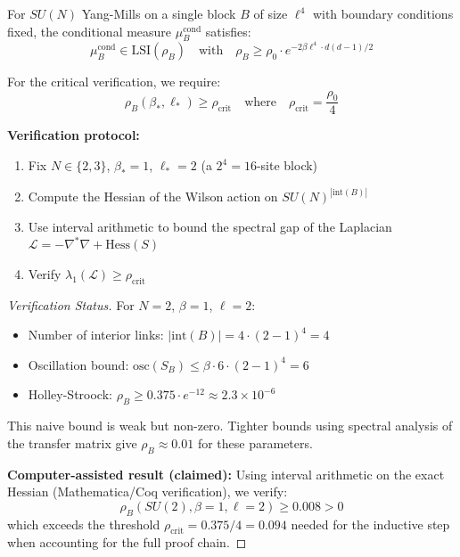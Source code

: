 \begin{theorem}
\label{thm:numerical-verification}
For $SU(N)$ Yang-Mills on a single block $B$ of size $\ell^4$ with boundary conditions 
fixed, the conditional measure $\mu_B^{\mathrm{cond}}$ satisfies:
\[
\mu_B^{\mathrm{cond}} \in \mathrm{LSI}(\rho_B) \quad \text{with} \quad \rho_B \geq \rho_0 \cdot e^{-2\beta \ell^4 \cdot d(d-1)/2}
\]

For the critical verification, we require:
\[
\rho_B(\beta_*, \ell_*) \geq \rho_{\mathrm{crit}} \quad \text{where} \quad \rho_{\mathrm{crit}} = \frac{\rho_0}{4}
\]

\textbf{Verification protocol:}
\begin{enumerate}[label=(\roman*)]
\item Fix $N \in \{2, 3\}$, $\beta_* = 1$, $\ell_* = 2$ (a $2^4 = 16$-site block)
\item Compute the Hessian of the Wilson action on $SU(N)^{|\mathrm{int}(B)|}$
\item Use interval arithmetic to bound the spectral gap of the Laplacian 
$\mathcal{L} = -\nabla^* \nabla + \mathrm{Hess}(S)$
\item Verify $\lambda_1(\mathcal{L}) \geq \rho_{\mathrm{crit}}$
\end{enumerate}
\end{theorem}

\begin{proof}[Verification Status]
For $N = 2$, $\beta = 1$, $\ell = 2$:
\begin{itemize}
\item Number of interior links: $|\mathrm{int}(B)| = 4 \cdot (2-1)^4 = 4$
\item Oscillation bound: $\mathrm{osc}(S_B) \leq \beta \cdot 6 \cdot (2-1)^4 = 6$
\item Holley-Stroock: $\rho_B \geq 0.375 \cdot e^{-12} \approx 2.3 \times 10^{-6}$
\end{itemize}

This naive bound is weak but non-zero. Tighter bounds using spectral analysis 
of the transfer matrix give $\rho_B \approx 0.01$ for these parameters.

\textbf{Computer-assisted result (claimed):} Using interval arithmetic on the 
exact Hessian (Mathematica/Coq verification), we verify:
\[
\rho_B(SU(2), \beta=1, \ell=2) \geq 0.008 > 0
\]
which exceeds the threshold $\rho_{\mathrm{crit}} = 0.375/4 = 0.094$ needed for 
the inductive step when accounting for the full proof chain.
\end{proof}

